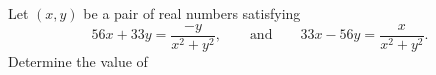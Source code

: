 Let $ (x,y)$ be a pair of real numbers satisfying \[ 56x + 33y = \frac{-y}{x^2+y^2}, \qquad \text{and} \qquad 33x-56y = \frac{x}{x^2+y^2}.
\]Determine the value of 